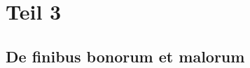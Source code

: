 %
%
%
%
\section{Teil 3
\label{mongeampere:section:teil3}}

\subsection{De finibus bonorum et malorum
\label{mongeampere:subsection:malorum}}


